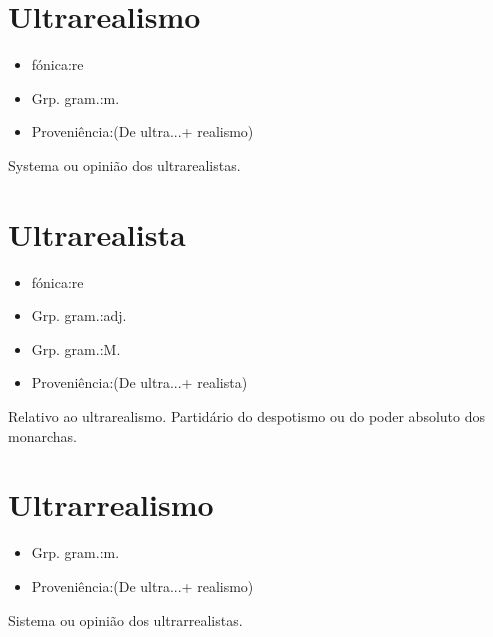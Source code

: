 \documentclass{article}
\begin{document}
\section{Ultrarealismo}
\begin{itemize}
\item {fónica:re}
\end{itemize}
\begin{itemize}
\item {Grp. gram.:m.}
\end{itemize}
\begin{itemize}
\item {Proveniência:(De \textunderscore ultra...\textunderscore  + \textunderscore realismo\textunderscore )}
\end{itemize}
Systema ou opinião dos ultrarealistas.
\section{Ultrarealista}
\begin{itemize}
\item {fónica:re}
\end{itemize}
\begin{itemize}
\item {Grp. gram.:adj.}
\end{itemize}
\begin{itemize}
\item {Grp. gram.:M.}
\end{itemize}
\begin{itemize}
\item {Proveniência:(De \textunderscore ultra...\textunderscore  + \textunderscore realista\textunderscore )}
\end{itemize}
Relativo ao ultrarealismo.
Partidário do despotismo ou do poder absoluto dos monarchas.
\section{Ultrarrealismo}
\begin{itemize}
\item {Grp. gram.:m.}
\end{itemize}
\begin{itemize}
\item {Proveniência:(De \textunderscore ultra...\textunderscore  + \textunderscore realismo\textunderscore )}
\end{itemize}
Sistema ou opinião dos ultrarrealistas.
\end{document}
